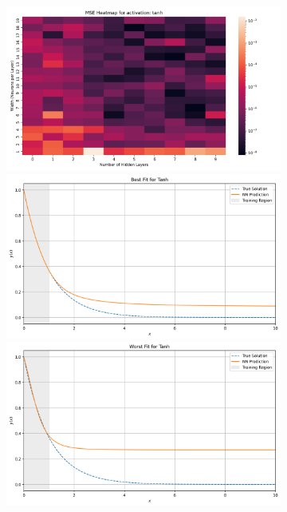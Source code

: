 \begin{figure}[ht]
    \centering
    \hspace*{\fill}
    \begin{subfigure}[t]{0.48\textwidth}
        \centering
        \includegraphics[width=\textwidth]{graphics/mse_heatmap_tanh.png}
        \includegraphics[width=\textwidth]{graphics/best_fit_tanh_6layers_15width.png}
        \includegraphics[width=\textwidth]{graphics/worst_fit_tanh_8layers_1width.png}

\end{subfigure}
\end{figure}
